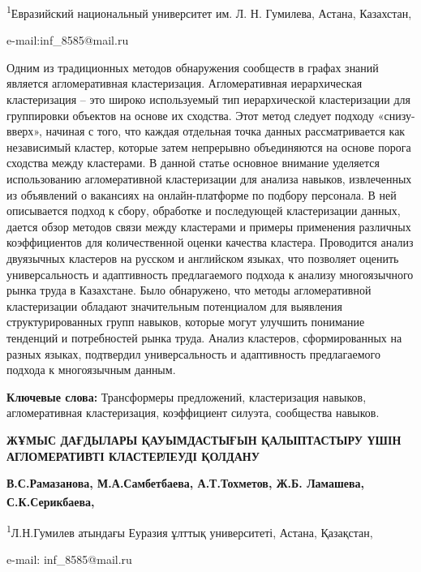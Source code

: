 \begin{affiliation}
\textsuperscript{1}Евразийский национальный университет им. Л. Н.
Гумилева, Астана, Казахстан,

e-mail:inf\_8585@mail.ru
\end{affiliation}

Одним из традиционных методов обнаружения сообществ в графах знаний
является агломеративная кластеризация. Агломеративная иерархическая
кластеризация -- это широко используемый тип иерархической кластеризации
для группировки объектов на основе их сходства. Этот метод следует
подходу «снизу-вверх», начиная с того, что каждая отдельная точка данных
рассматривается как независимый кластер, которые затем непрерывно
объединяются на основе порога сходства между кластерами. В данной статье
основное внимание уделяется использованию агломеративной кластеризации
для анализа навыков, извлеченных из объявлений о вакансиях на
онлайн-платформе по подбору персонала. В ней описывается подход к сбору,
обработке и последующей кластеризации данных, дается обзор методов связи
между кластерами и примеры применения различных коэффициентов для
количественной оценки качества кластера. Проводится анализ двуязычных
кластеров на русском и английском языках, что позволяет оценить
универсальность и адаптивность предлагаемого подхода к анализу
многоязычного рынка труда в Казахстане. Было обнаружено, что методы
агломеративной кластеризации обладают значительным потенциалом для
выявления структурированных групп навыков, которые могут улучшить
понимание тенденций и потребностей рынка труда. Анализ кластеров,
сформированных на разных языках, подтвердил универсальность и
адаптивность предлагаемого подхода к многоязычным данным.

{\bfseries Ключевые слова:} Трансформеры предложений, кластеризация
навыков, агломеративная кластеризация, коэффициент силуэта, сообщества
навыков.

\begin{articleheader}
{\bfseries ЖҰМЫС ДАҒДЫЛАРЫ ҚАУЫМДАСТЫҒЫН ҚАЛЫПТАСТЫРУ ҮШІН АГЛОМЕРАТИВТІ
КЛАСТЕРЛЕУДІ ҚОЛДАНУ}

{\bfseries В.С.Рамазанова, М.А.Самбетбаева, А.Т.Тохметов, Ж.Б. Ламашева,
С.К.Серикбаева\textsuperscript{\envelope },}
\end{articleheader}

\begin{affiliation}
\textsuperscript{1}Л.Н.Гумилев атындағы Еуразия ұлттық университеті,
Астана, Қазақстан,

e-mail: inf\_8585@mail.ru
\end{affiliation}

